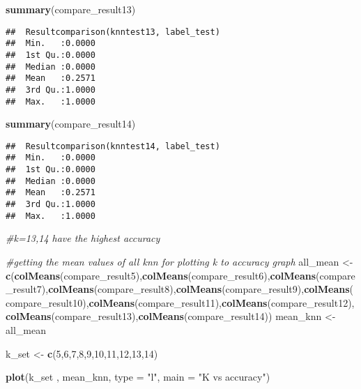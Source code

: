 \documentclass[]{article}
\newenvironment{Shaded}{\begin{snugshade}}{\end{snugshade}}
\newcommand{\KeywordTok}[1]{\textcolor[rgb]{0.13,0.29,0.53}{\textbf{#1}}}
\newcommand{\DataTypeTok}[1]{\textcolor[rgb]{0.13,0.29,0.53}{#1}}
\newcommand{\DecValTok}[1]{\textcolor[rgb]{0.00,0.00,0.81}{#1}}
\newcommand{\StringTok}[1]{\textcolor[rgb]{0.31,0.60,0.02}{#1}}
\newcommand{\CommentTok}[1]{\textcolor[rgb]{0.56,0.35,0.01}{\textit{#1}}}
\newcommand{\NormalTok}[1]{#1}
\begin{document}
\begin{Shaded}
\begin{Highlighting}[]
\KeywordTok{summary}\NormalTok{(compare_result13)}
\end{Highlighting}
\end{Shaded}

\begin{verbatim}
##  Resultcomparison(knntest13, label_test)
##  Min.   :0.0000                         
##  1st Qu.:0.0000                         
##  Median :0.0000                         
##  Mean   :0.2571                         
##  3rd Qu.:1.0000                         
##  Max.   :1.0000
\end{verbatim}

\begin{Shaded}
\begin{Highlighting}[]
\KeywordTok{summary}\NormalTok{(compare_result14)}
\end{Highlighting}
\end{Shaded}

\begin{verbatim}
##  Resultcomparison(knntest14, label_test)
##  Min.   :0.0000                         
##  1st Qu.:0.0000                         
##  Median :0.0000                         
##  Mean   :0.2571                         
##  3rd Qu.:1.0000                         
##  Max.   :1.0000
\end{verbatim}

\begin{Shaded}
\begin{Highlighting}[]
\CommentTok{#k=13,14 have the highest accuracy}

\CommentTok{#getting the mean values of all knn for plotting k to accuracy graph}
\NormalTok{all_mean <-}\StringTok{ }\KeywordTok{c}\NormalTok{(}\KeywordTok{colMeans}\NormalTok{(compare_result5),}\KeywordTok{colMeans}\NormalTok{(compare_result6),}\KeywordTok{colMeans}\NormalTok{(compare_result7),}\KeywordTok{colMeans}\NormalTok{(compare_result8),}\KeywordTok{colMeans}\NormalTok{(compare_result9),}\KeywordTok{colMeans}\NormalTok{(compare_result10),}\KeywordTok{colMeans}\NormalTok{(compare_result11),}\KeywordTok{colMeans}\NormalTok{(compare_result12),}\KeywordTok{colMeans}\NormalTok{(compare_result13),}\KeywordTok{colMeans}\NormalTok{(compare_result14))}
\NormalTok{mean_knn <-}\StringTok{  }\NormalTok{all_mean}

\NormalTok{k_set <-}\StringTok{ }\KeywordTok{c}\NormalTok{(}\DecValTok{5}\NormalTok{,}\DecValTok{6}\NormalTok{,}\DecValTok{7}\NormalTok{,}\DecValTok{8}\NormalTok{,}\DecValTok{9}\NormalTok{,}\DecValTok{10}\NormalTok{,}\DecValTok{11}\NormalTok{,}\DecValTok{12}\NormalTok{,}\DecValTok{13}\NormalTok{,}\DecValTok{14}\NormalTok{)}

\KeywordTok{plot}\NormalTok{(k_set , mean_knn, }\DataTypeTok{type =} \StringTok{"l"}\NormalTok{, }\DataTypeTok{main =} \StringTok{"K vs accuracy"}\NormalTok{)}
\end{Highlighting}
\end{Shaded}
\end{document}
